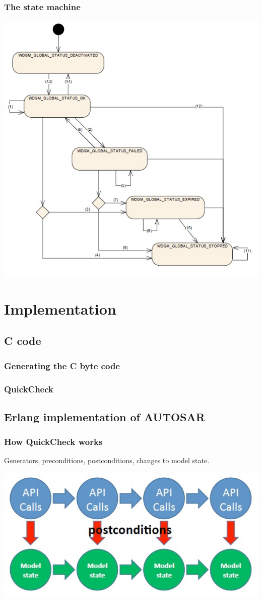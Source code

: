 \documentclass{beamer}
\begin{document}
\begin{frame}
  \frametitle{The state machine}
  \includegraphics[keepaspectratio, width=0.7\linewidth]{globalstatuses}
\end{frame}

\section{Implementation}
\subsection{C code}
\begin{frame}
  \frametitle{Generating the C byte code}
  
\end{frame}

\begin{frame}
  \frametitle{QuickCheck}
  
\end{frame}

\subsection{Erlang implementation of AUTOSAR}

\begin{frame}
  \frametitle{How QuickCheck works}
  Generators, preconditions, postconditions, changes to model state.

  \includegraphics[keepaspectratio, width=0.7\linewidth]{api_calls}
\end{frame}
\end{document}
